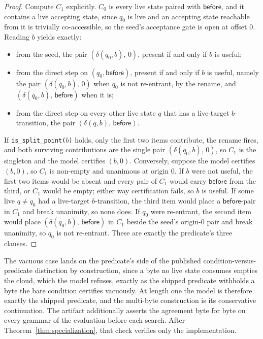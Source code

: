 \documentclass[11pt,a4paper]{article}
\theoremstyle{definition}
\theoremstyle{plain}
\newcommand{\code}[1]{\texttt{#1}}
\newcommand{\before}{\mathsf{before}}
\begin{document}
\begin{proof}
Compute $C_1$ explicitly. $C_0$ is every live state paired with $\before$, and it contains a live accepting state, since
$q_0$ is live and an accepting state reachable from it is trivially co-accessible, so the seed's acceptance gate is open
at offset 0. Reading $b$ yields exactly:

\begin{itemize}
\item
from the seed, the pair $(\delta(q_0, b),\, 0)$, present if and only if $b$ is useful;
\item
from the direct step on $(q_0, \before)$, present if and only if $b$ is useful, namely the pair $(\delta(q_0, b),\, 0)$
when $q_0$ is not re-entrant, by the rename, and $(\delta(q_0, b),\, \before)$ when it is;
\item
from the direct step on every other live state $q$ that has a live-target $b$-transition, the pair
$(\delta(q, b),\, \before)$.
\end{itemize}

If \code{is\_split\_point($b$)} holds, only the first two items contribute, the rename fires, and both surviving
contributions are the single pair $(\delta(q_0, b),\, 0)$, so $C_1$ is the singleton and the model certifies $(b, 0)$.
Conversely, suppose the model certifies $(b, 0)$, so $C_1$ is non-empty and unanimous at origin $0$. If $b$ were not
useful, the first two items would be absent and every pair of $C_1$ would carry $\before$ from the third, or $C_1$ would
be empty; either way certification fails, so $b$ is useful. If some live $q \neq q_0$ had a live-target $b$-transition,
the third item would place a $\before$-pair in $C_1$ and break unanimity, so none does. If $q_0$ were re-entrant, the
second item would place $(\delta(q_0, b),\, \before)$ in $C_1$ beside the seed's origin-$0$ pair and break unanimity, so
$q_0$ is not re-entrant. These are exactly the predicate's three clauses.
\end{proof}

The vacuous case lands on the predicate's side of the published condition-versus-predicate distinction by construction,
since a byte no live state consumes empties the cloud, which the model refuses, exactly as the shipped predicate
withholds a byte the bare condition certifies vacuously. At length one the model is therefore exactly the shipped
predicate, and the multi-byte construction is its conservative continuation. The artifact additionally asserts the
agreement byte for byte on every grammar of the evaluation before each search. After Theorem~\ref{thm:specialization},
that check verifies only the implementation.
\end{document}
